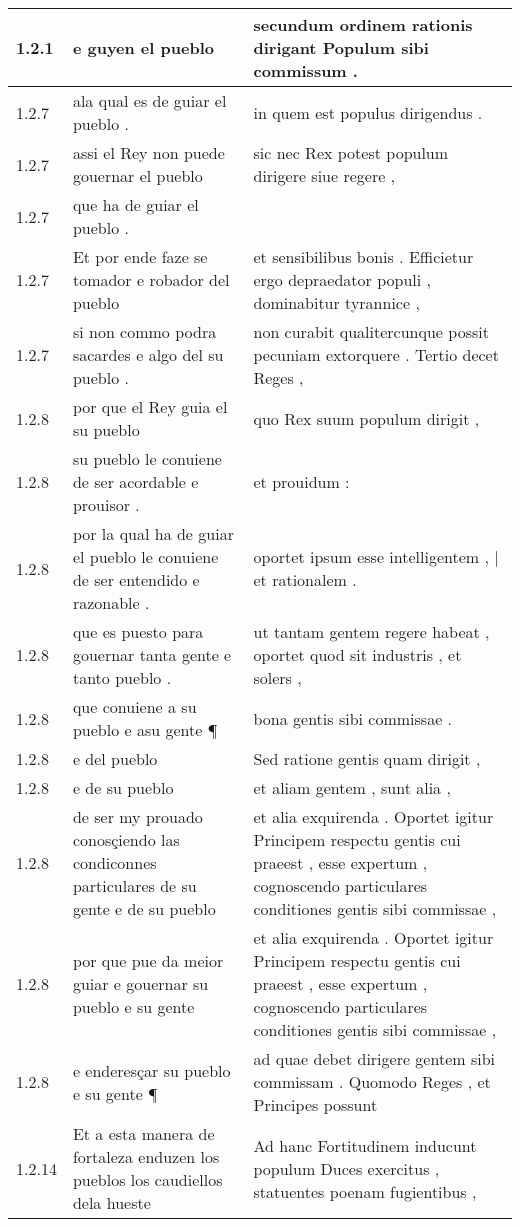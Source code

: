 \begin{tabular}{|p{1cm}|p{6.5cm}|p{6.5cm}|}
1.2.1 & e guyen el pueblo & secundum ordinem rationis dirigant Populum sibi commissum . \\\hline
1.2.7 & ala qual es de guiar el pueblo . & in quem est populus dirigendus . \\\hline
1.2.7 & assi el Rey non puede gouernar el pueblo & sic nec Rex potest populum dirigere siue regere , \\\hline
1.2.7 & que ha de guiar el pueblo . &  \\\hline
1.2.7 & Et por ende faze se tomador e robador del pueblo & et sensibilibus bonis . Efficietur ergo depraedator populi , dominabitur tyrannice , \\\hline
1.2.7 & si non commo podra sacardes e algo del su pueblo . & non curabit qualitercunque possit pecuniam extorquere . Tertio decet Reges , \\\hline
1.2.8 & por que el Rey guia el su pueblo & quo Rex suum populum dirigit , \\\hline
1.2.8 & su pueblo le conuiene de ser acordable e prouisor . & et prouidum : \\\hline
1.2.8 & por la qual ha de guiar el pueblo le conuiene de ser entendido e razonable . & oportet ipsum esse intelligentem , | et rationalem . \\\hline
1.2.8 & que es puesto para gouernar tanta gente e tanto pueblo . & ut tantam gentem regere habeat , oportet quod sit industris , et solers , \\\hline
1.2.8 & que conuiene a su pueblo e asu gente ¶ & bona gentis sibi commissae . \\\hline
1.2.8 & e del pueblo & Sed ratione gentis quam dirigit , \\\hline
1.2.8 & e de su pueblo & et aliam gentem , sunt alia , \\\hline
1.2.8 & de ser my prouado conosçiendo las condiconnes particulares de su gente e de su pueblo & et alia exquirenda . Oportet igitur Principem respectu gentis cui praeest , esse expertum , cognoscendo particulares conditiones gentis sibi commissae , \\\hline
1.2.8 & por que pue da meior guiar e gouernar su pueblo e su gente & et alia exquirenda . Oportet igitur Principem respectu gentis cui praeest , esse expertum , cognoscendo particulares conditiones gentis sibi commissae , \\\hline
1.2.8 & e enderesçar su pueblo e su gente ¶ & ad quae debet dirigere gentem sibi commissam . Quomodo Reges , et Principes possunt \\\hline
1.2.14 & Et a esta manera de fortaleza enduzen los pueblos los caudiellos dela hueste & Ad hanc Fortitudinem inducunt populum Duces exercitus , statuentes poenam fugientibus , \\\hline

\end{tabular}

